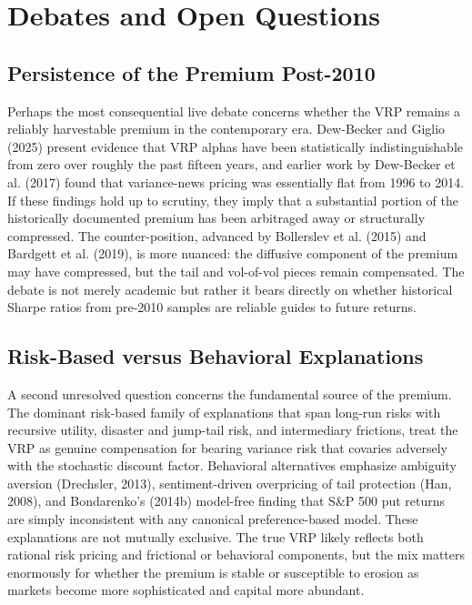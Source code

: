 \documentclass[11pt,a4paper]{article}
\begin{document}
\section{Debates and Open Questions}

\subsection{Persistence of the Premium Post-2010}

Perhaps the most consequential live debate concerns whether the VRP remains a reliably harvestable premium in the contemporary era. Dew-Becker and Giglio (2025) present evidence that VRP alphas have been statistically indistinguishable from zero over roughly the past fifteen years, and earlier work by Dew-Becker et al. (2017) found that variance-news pricing was essentially flat from 1996 to 2014. If these findings hold up to scrutiny, they imply that a substantial portion of the historically documented premium has been arbitraged away or structurally compressed. The counter-position, advanced by Bollerslev et al. (2015) and Bardgett et al. (2019), is more nuanced: the diffusive component of the premium may have compressed, but the tail and vol-of-vol pieces remain compensated. The debate is not merely academic but rather it bears directly on whether historical Sharpe ratios from pre-2010 samples are reliable guides to future returns.

\subsection{Risk-Based versus Behavioral Explanations}

A second unresolved question concerns the fundamental source of the premium. The dominant risk-based family of explanations that span long-run risks with recursive utility, disaster and jump-tail risk, and intermediary frictions, treat the VRP as genuine compensation for bearing variance risk that covaries adversely with the stochastic discount factor. Behavioral alternatives emphasize ambiguity aversion (Drechsler, 2013), sentiment-driven overpricing of tail protection (Han, 2008), and Bondarenko's (2014b) model-free finding that S\&P 500 put returns are simply inconsistent with any canonical preference-based model. These explanations are not mutually exclusive. The true VRP likely reflects both rational risk pricing and frictional or behavioral components, but the mix matters enormously for whether the premium is stable or susceptible to erosion as markets become more sophisticated and capital more abundant.
\end{document}
